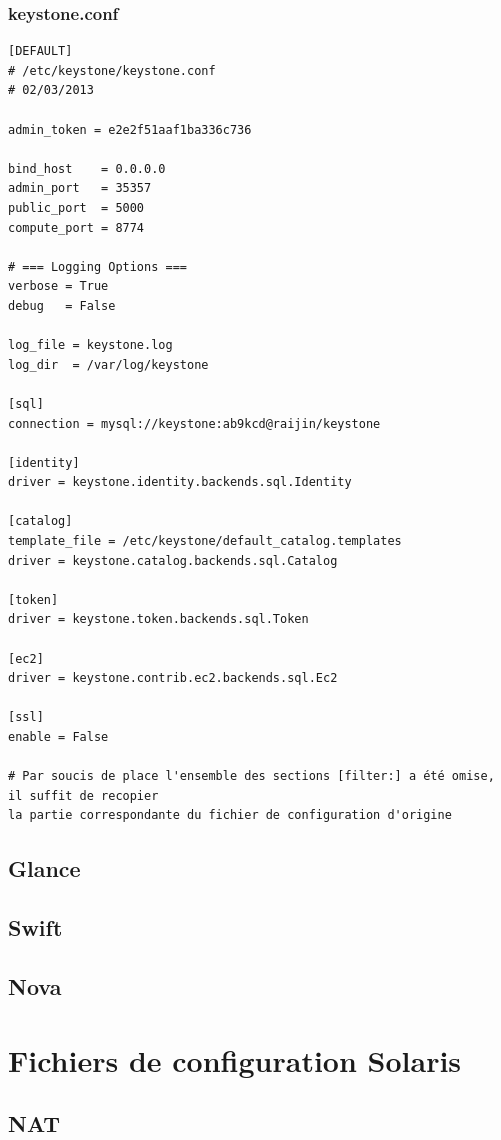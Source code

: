 \documentclass[a4paper,oneside]{report}
\begin{document}
\subsection{keystone.conf}
\begin{verbatim}
[DEFAULT]
# /etc/keystone/keystone.conf
# 02/03/2013

admin_token = e2e2f51aaf1ba336c736

bind_host    = 0.0.0.0
admin_port   = 35357
public_port  = 5000
compute_port = 8774

# === Logging Options ===
verbose = True
debug   = False

log_file = keystone.log
log_dir  = /var/log/keystone

[sql]
connection = mysql://keystone:ab9kcd@raijin/keystone

[identity]
driver = keystone.identity.backends.sql.Identity

[catalog]
template_file = /etc/keystone/default_catalog.templates
driver = keystone.catalog.backends.sql.Catalog

[token]
driver = keystone.token.backends.sql.Token

[ec2]
driver = keystone.contrib.ec2.backends.sql.Ec2

[ssl]
enable = False

# Par soucis de place l'ensemble des sections [filter:] a été omise,  il suffit de recopier
la partie correspondante du fichier de configuration d'origine
\end{verbatim}

\section{Glance} \label{conf:Glance}

\section{Swift} \label{conf:Swift}

\section{Nova} \label{conf:Nova}

\chapter{Fichiers de configuration Solaris}
\section{NAT}
\end{document}
